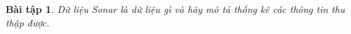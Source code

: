 \documentclass[14pt, a4paper]{article}
\theoremstyle{sltheorem}
\newtheorem{baitap}{Bài tập}
\theoremstyle{soltheorem}
\begin{document}
\begin{titlepage}





    \vfill %

\end{titlepage}

\nocite{*}

\newpage

\begin{baitap}
    Dữ liệu Sonar là dữ liệu gì và hãy mô tả thống kê các thông tin thu thập được.
\end{baitap}
\end{document}
